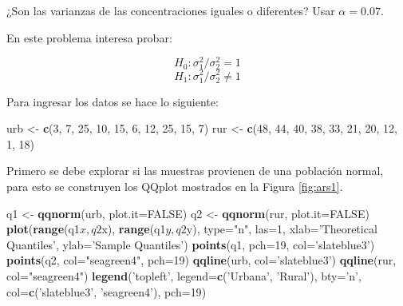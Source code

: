 \documentclass[10pt,]{krantz}
\makeatletter
\newenvironment{Shaded}{\begin{snugshade}}{\end{snugshade}}
\newcommand{\KeywordTok}[1]{\textcolor[rgb]{0.13,0.29,0.53}{\textbf{{#1}}}}
\newcommand{\DataTypeTok}[1]{\textcolor[rgb]{0.13,0.29,0.53}{{#1}}}
\newcommand{\DecValTok}[1]{\textcolor[rgb]{0.00,0.00,0.81}{{#1}}}
\newcommand{\StringTok}[1]{\textcolor[rgb]{0.31,0.60,0.02}{{#1}}}
\newcommand{\OtherTok}[1]{\textcolor[rgb]{0.56,0.35,0.01}{{#1}}}
\newcommand{\NormalTok}[1]{{#1}}
\newenvironment{kframe}{%
\medskip{}
\setlength{\fboxsep}{.8em}
 \def\at@end@of@kframe{}%
 \ifinner\ifhmode%
  \def\at@end@of@kframe{\end{minipage}}%
  \begin{minipage}{\columnwidth}%
 \fi\fi%
 \def\FrameCommand##1{\hskip\@totalleftmargin \hskip-\fboxsep
 \colorbox{shadecolor}{##1}\hskip-\fboxsep
     \hskip-\linewidth \hskip-\@totalleftmargin \hskip\columnwidth}%
 \MakeFramed {\advance\hsize-\width
   \@totalleftmargin\z@ \linewidth\hsize
   \@setminipage}}%
 {\par\unskip\endMakeFramed%
 \at@end@of@kframe}
\renewenvironment{Shaded}{\begin{kframe}}{\end{kframe}}
\makeatother
\begin{document}
¿Son las varianzas de las concentraciones iguales o diferentes? Usar
\(\alpha=0.07\).

En este problema interesa probar:

\[H_0: \sigma_1^2 / \sigma_2^2 = 1\]
\[H_1: \sigma_1^2 / \sigma_2^2 \neq 1\]

Para ingresar los datos se hace lo siguiente:

\begin{Shaded}
\begin{Highlighting}[]
\NormalTok{urb <-}\StringTok{ }\KeywordTok{c}\NormalTok{(}\DecValTok{3}\NormalTok{, }\DecValTok{7}\NormalTok{, }\DecValTok{25}\NormalTok{, }\DecValTok{10}\NormalTok{, }\DecValTok{15}\NormalTok{, }\DecValTok{6}\NormalTok{, }\DecValTok{12}\NormalTok{, }\DecValTok{25}\NormalTok{, }\DecValTok{15}\NormalTok{, }\DecValTok{7}\NormalTok{)}
\NormalTok{rur <-}\StringTok{ }\KeywordTok{c}\NormalTok{(}\DecValTok{48}\NormalTok{, }\DecValTok{44}\NormalTok{, }\DecValTok{40}\NormalTok{, }\DecValTok{38}\NormalTok{, }\DecValTok{33}\NormalTok{, }\DecValTok{21}\NormalTok{, }\DecValTok{20}\NormalTok{, }\DecValTok{12}\NormalTok{, }\DecValTok{1}\NormalTok{, }\DecValTok{18}\NormalTok{)}
\end{Highlighting}
\end{Shaded}

Primero se debe explorar si las muestras provienen de una población
normal, para esto se construyen los QQplot mostrados en la Figura
\ref{fig:ars1}.

\begin{Shaded}
\begin{Highlighting}[]
\NormalTok{q1 <-}\StringTok{ }\KeywordTok{qqnorm}\NormalTok{(urb, }\DataTypeTok{plot.it=}\OtherTok{FALSE}\NormalTok{)}
\NormalTok{q2 <-}\StringTok{ }\KeywordTok{qqnorm}\NormalTok{(rur, }\DataTypeTok{plot.it=}\OtherTok{FALSE}\NormalTok{)}
\KeywordTok{plot}\NormalTok{(}\KeywordTok{range}\NormalTok{(q1$x, q2$x), }\KeywordTok{range}\NormalTok{(q1$y, q2$y), }\DataTypeTok{type=}\StringTok{"n"}\NormalTok{, }\DataTypeTok{las=}\DecValTok{1}\NormalTok{,}
     \DataTypeTok{xlab=}\StringTok{'Theoretical Quantiles'}\NormalTok{, }\DataTypeTok{ylab=}\StringTok{'Sample Quantiles'}\NormalTok{)}
\KeywordTok{points}\NormalTok{(q1, }\DataTypeTok{pch=}\DecValTok{19}\NormalTok{, }\DataTypeTok{col=}\StringTok{'slateblue3'}\NormalTok{)}
\KeywordTok{points}\NormalTok{(q2, }\DataTypeTok{col=}\StringTok{"seagreen4"}\NormalTok{, }\DataTypeTok{pch=}\DecValTok{19}\NormalTok{)}
\KeywordTok{qqline}\NormalTok{(urb, }\DataTypeTok{col=}\StringTok{'slateblue3'}\NormalTok{)}
\KeywordTok{qqline}\NormalTok{(rur, }\DataTypeTok{col=}\StringTok{"seagreen4"}\NormalTok{)}
\KeywordTok{legend}\NormalTok{(}\StringTok{'topleft'}\NormalTok{, }\DataTypeTok{legend=}\KeywordTok{c}\NormalTok{(}\StringTok{'Urbana'}\NormalTok{, }\StringTok{'Rural'}\NormalTok{), }\DataTypeTok{bty=}\StringTok{'n'}\NormalTok{,}
       \DataTypeTok{col=}\KeywordTok{c}\NormalTok{(}\StringTok{'slateblue3'}\NormalTok{, }\StringTok{'seagreen4'}\NormalTok{), }\DataTypeTok{pch=}\DecValTok{19}\NormalTok{)}
\end{Highlighting}
\end{Shaded}
\end{document}
